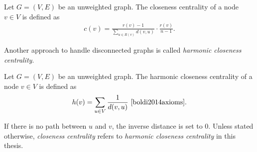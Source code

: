 \begin{definition}
\label{def:closenessGeneral}
Let $G = (V, E)$ be an unweighted graph. The closeness centrality of a node $v \in V$ is defined as
\begin{align*}
	c(v) = \frac{r(v) - 1}{\sum_{u \in R(v)}{d(v, u)}} \cdot \frac{r(v)}{n - 1}.
\end{align*}
\end{definition}

Another approach to handle disconnected graphs is called \emph{harmonic closeness centrality}.

\begin{definition}
\label{def:harmonicCentrality}
Let $G = (V, E)$ be an unweighted graph. The harmonic closeness centrality of a node $v \in V$ is defined as
\begin{align*}
	h(v) = \sum_{u \in V}{\frac{1}{d(v, u)}}\text{~\cite{boldi2014axioms}}.
\end{align*}
\end{definition}
If there is no path between $u$ and $v$, the inverse distance is set to $0$. Unless stated otherwise, \emph{closeness centrality} refers to \emph{harmonic closeness centrality} in this thesis.